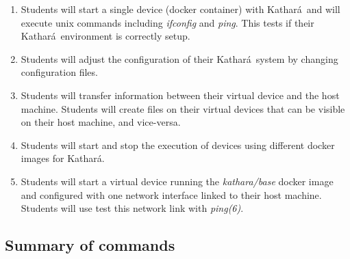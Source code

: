 \documentclass[12pt]{book}
\newcommand{\kathara}{Kathar\'a}
\begin{document}
\begin{enumerate}[label=Objective \arabic*:]
  \item\label{vstart} Students will start a single device (docker container) with \kathara\ and will execute unix commands including \emph{ifconfig} and \emph{ping}. This tests if their \kathara\ environment is correctly setup.
  \item\label{config} Students will adjust the configuration of their \kathara\ system by changing configuration files.
  \item\label{hosthome} Students will transfer information between their virtual device and the host machine. Students will create files on their virtual devices that can be visible on their host machine, and vice-versa.
  \item\label{image} Students will start and stop the execution of devices using different docker images for \kathara.
    \item\label{bridged} Students will start a virtual device running the \emph{kathara/base} docker image and configured with one network interface linked to their host machine. Students will use test this network link with \emph{ping(6)}. 
\end{enumerate}


\subsection{Summary of commands}
\end{document}
